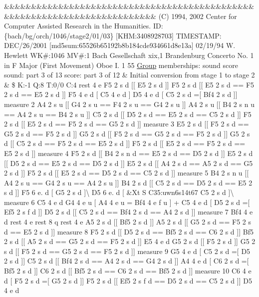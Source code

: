 \&\&\&\&\&\&\&\&\&\&\&\&\&\&\&\&\&\&\&\&\&\&\&\&\&\&\&\&\&\&\&\&\&\&\&\&\&\&\&\&\&\&\&\&\&\&\&\&\&\&\&\&\&\&\&\&\&\&\&\&\&\&\&\&\&\&\&\&\&\&\&\&\&\& (C) 1994, 2002 Center for Computer Assisted Research in the Humanities. ID\+: \{bach/bg/orch/1046/stage2/01/03\} \mbox{[}K\+HM\+:3408928703\mbox{]} T\+I\+M\+E\+S\+T\+A\+MP\+: D\+E\+C/26/2001 \mbox{[}md5sum\+:65526b65192b8b184cde934661d8e13a\mbox{]} 02/19/94 W. Hewlett WK\#\+:1046 MV\#\+:1 Bach Gesellschaft xix,1 Brandenburg Concerto No. 1 in F Major (First Movement) Oboe I. 1 55 \hyperlink{class_group}{Group} memberships\+: sound score sound\+: part 3 of 13 score\+: part 3 of 12 \& Initial conversion from stage 1 to stage 2 \& \$ K\+:-\/1 Q\+:8 T\+:0/0 C\+:4 rest 4 e F5 2 s d \mbox{[}\mbox{[} E5 2 s d \mbox{]}\mbox{]} F5 2 s d \mbox{[}\mbox{[} E5 2 s d == F5 2 s d == E5 2 s d \mbox{]}\mbox{]} F5 4 e d \mbox{[} C5 4 e d \mbox{]} D5 4 e d \mbox{[} C5 2 s d =\mbox{[} Bf4 2 s d \mbox{]}\mbox{]} measure 2 A4 2 s u \mbox{[}\mbox{[} G4 2 s u == F4 2 s u == G4 2 s u \mbox{]}\mbox{]} A4 2 s u \mbox{[}\mbox{[} B4 2 s n u == A4 2 s u == B4 2 s u \mbox{]}\mbox{]} C5 2 s d \mbox{[}\mbox{[} D5 2 s d == E5 2 s d == C5 2 s d \mbox{]}\mbox{]} F5 2 s d \mbox{[}\mbox{[} E5 2 s d == F5 2 s d == G5 2 s d \mbox{]}\mbox{]} measure 3 E5 2 s d \mbox{[}\mbox{[} F5 2 s d == G5 2 s d == F5 2 s d \mbox{]}\mbox{]} G5 2 s d \mbox{[}\mbox{[} F5 2 s d == G5 2 s d == F5 2 s d \mbox{]}\mbox{]} G5 2 s d \mbox{[}\mbox{[} C5 2 s d == F5 2 s d == E5 2 s d \mbox{]}\mbox{]} F5 2 s d \mbox{[}\mbox{[} E5 2 s d == F5 2 s d == E5 2 s d \mbox{]}\mbox{]} measure 4 F5 2 s d \mbox{[}\mbox{[} B4 2 s n d == E5 2 s d == D5 2 s d \mbox{]}\mbox{]} E5 2 s d \mbox{[}\mbox{[} D5 2 s d == E5 2 s d == D5 2 s d \mbox{]}\mbox{]} E5 2 s d \mbox{[}\mbox{[} A4 2 s d == A5 2 s d == G5 2 s d \mbox{]}\mbox{]} F5 2 s d \mbox{[}\mbox{[} E5 2 s d == D5 2 s d == C5 2 s d \mbox{]}\mbox{]} measure 5 B4 2 s n u \mbox{[}\mbox{[} A4 2 s u == G4 2 s u == A4 2 s u \mbox{]}\mbox{]} B4 2 s d \mbox{[}\mbox{[} C5 2 s d == D5 2 s d == E5 2 s d \mbox{]}\mbox{]} F5 6 e. d \mbox{[} G5 2 s d \mbox{]}\textbackslash{} D5 6 e. d \mbox{[} \&Xt S C35\+:uwn6s14t67 C5 2 s d \mbox{]}\textbackslash{} measure 6 C5 4 e d G4 4 e u \mbox{[} A4 4 e u = Bf4 4 e f u \mbox{]} + C5 4 e d \mbox{[} D5 2 s d =\mbox{[} Ef5 2 s f d \mbox{]}\mbox{]} D5 2 s d \mbox{[}\mbox{[} C5 2 s d == Bf4 2 s d == A4 2 s d \mbox{]}\mbox{]} measure 7 Bf4 4 e d rest 4 e rest 8 q rest 4 e A5 2 s d \mbox{[}\mbox{[} Bf5 2 s d \mbox{]}\mbox{]} A5 2 s d \mbox{[}\mbox{[} G5 2 s d == F5 2 s d == E5 2 s d \mbox{]}\mbox{]} measure 8 F5 2 s d \mbox{[}\mbox{[} D5 2 s d == Bf5 2 s d == C6 2 s d \mbox{]}\mbox{]} Bf5 2 s d \mbox{[}\mbox{[} A5 2 s d == G5 2 s d == F5 2 s d \mbox{]}\mbox{]} E5 4 e d G5 2 s d \mbox{[}\mbox{[} F5 2 s d \mbox{]}\mbox{]} G5 2 s d \mbox{[}\mbox{[} F5 2 s d == G5 2 s d == F5 2 s d \mbox{]}\mbox{]} measure 9 G5 4 e d \mbox{[} C5 2 s d =\mbox{[} D5 2 s d \mbox{]}\mbox{]} C5 2 s d \mbox{[}\mbox{[} Bf4 2 s d == A4 2 s d == G4 2 s d \mbox{]}\mbox{]} A4 4 e d \mbox{[} C6 2 s d =\mbox{[} Bf5 2 s d \mbox{]}\mbox{]} C6 2 s d \mbox{[}\mbox{[} Bf5 2 s d == C6 2 s d == Bf5 2 s d \mbox{]}\mbox{]} measure 10 C6 4 e d \mbox{[} F5 2 s d =\mbox{[} G5 2 s d \mbox{]}\mbox{]} F5 2 s d \mbox{[}\mbox{[} Ef5 2 s f d == D5 2 s d == C5 2 s d \mbox{]}\mbox{]} D5 4 e d 